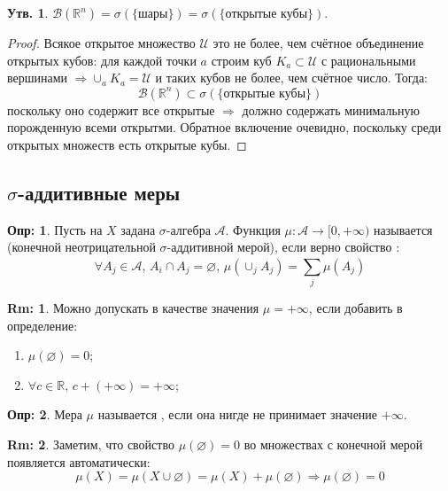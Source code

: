 \documentclass[12pt]{article}
\newcommand{\MR}{\mathbb{R}}
\newcommand{\MU}{\mathcal{U}}
\newcommand{\MA}{\mathcal{A}}
\newcommand{\MB}{\mathcal{B}}
\newcommand{\VN}{\varnothing}
\theoremstyle{definition}
\newtheorem{defn}{Опр:}
\newtheorem{rem}{Rm:}
\newtheorem{prop}{Утв.}
\newcommand{\ddsum}[2]{\displaystyle\sum\limits_{#1}^{#2}}
\begin{document}
\begin{prop}
	$\MB(\MR^n) = \sigma(\{\text{шары}\}) = \sigma(\{\text{открытые кубы}\})$.
\end{prop}
\begin{proof}
	Всякое открытое множество $\MU$ это не более, чем счётное объединение открытых кубов: для каждой точки $a$ строим куб $K_a \subset \MU$ с рациональными вершинами $\Rightarrow \cup_a K_a = \MU$ и таких кубов не более, чем счётное число. Тогда:
	$$
		\MB(\MR^n)\subset \sigma(\{\text{открытые кубы}\})
	$$
	поскольку оно содержит все открытые $\Rightarrow$ должно содержать минимальную порожденную всеми открытми. Обратное включение очевидно, поскольку среди открытых множеств есть открытые кубы.
\end{proof}

\subsection*{$\sigma$-аддитивные меры}

\begin{defn}
	Пусть на $X$ задана $\sigma$-алгебра $\MA$. Функция $\mu \colon \MA \to [0, +\infty)$ называется  (конечной неотрицательной $\sigma$-аддитивной мерой), если верно свойство : 
	$$
		\forall A_j \in \MA, \, A_i \cap A_j = \VN, \, \mu\left(\cup_j A_j\right) = \ddsum{j}{}\mu(A_j)
	$$
\end{defn}
\begin{rem}
	Можно допускать в качестве значения $\mu = +\infty$, если добавить в определение:
	\begin{enumerate}[label=\arabic*)]
		\item $\mu(\VN) = 0$;
		\item $\forall c \in \MR, \, c + (+\infty) = + \infty$;
	\end{enumerate}
\end{rem}
\begin{defn}
	Мера $\mu$ называется , если она нигде не принимает значение $+\infty$.
\end{defn}
\begin{rem}
	Заметим, что свойство $\mu(\VN) = 0$ во множествах с конечной мерой появляется автоматически:
	$$
		\mu(X) = \mu(X \cup \VN) = \mu(X) + \mu(\VN) \Rightarrow \mu(\VN) = 0
	$$
\end{rem}
\end{document}
